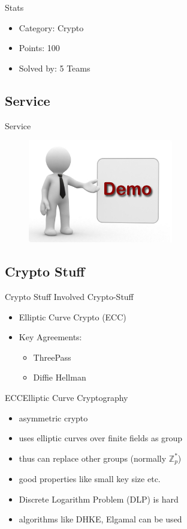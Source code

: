 \begin{frame}{Stats}
    \begin{itemize}
        \item Category: Crypto
        \item Points: 100
        \item Solved by: 5 Teams
    \end{itemize}
\end{frame}

\subsection{Service}
\begin{frame}{Service}
    \begin{figure}[!htb]
        \includegraphics[height=45mm]{data/demo.png}
    \end{figure}
\end{frame}

\subsection{Crypto Stuff}
\begin{frame}{Crypto Stuff}
    Involved Crypto-Stuff
    \begin{itemize}
        \item Elliptic Curve Crypto (ECC)
        \item Key Agreements: \begin{itemize}
            \item ThreePass
            \item Diffie Hellman
        \end{itemize}
    \end{itemize}
\end{frame}
\begin{frame}{ECC}{Elliptic Curve Cryptography}
    \begin{itemize}
        \item asymmetric crypto
        \item uses elliptic curves over finite fields as group
        \item thus can replace other groups (normally $\mathbb{Z}_p^*$)
        \item good properties like small key size etc.
    \end{itemize}
    \begin{itemize}
        \item Discrete Logarithm Problem (DLP) is hard
        \item algorithms like DHKE, Elgamal can be used
    \end{itemize}
\end{frame}

